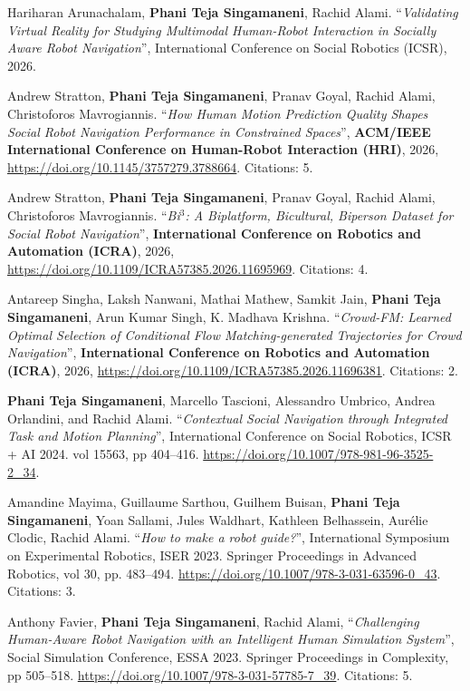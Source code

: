 \documentclass[11pt]{article}
\newcounter{descenum}
\newenvironment{descenumerate}[2]{%
  \setcounter{descenum}{#2}%
  \begin{enumerate}[
    topsep=0pt,
    itemsep=3pt,
    partopsep=0pt,
    parsep=0pt,
    label={[#1\arabic{descenum}]}
  ]
}{
  \end{enumerate}
}
\newcommand{\descitem}{%
  \item
  \addtocounter{descenum}{-1}
}
\newcommand{\bt}[1]{{\textbf{\color{teal} #1}}}
\begin{document}
\begin{descenumerate}{C}{22}
    \descitem \label{icsr26} Hariharan Arunachalam, \textbf{Phani Teja Singamaneni}, Rachid Alami. ``\textit{Validating Virtual Reality for Studying Multimodal Human-Robot Interaction in Socially Aware Robot Navigation}'', International Conference on Social Robotics (ICSR), 2026.

    \descitem \label{hri26} Andrew Stratton, \textbf{Phani Teja Singamaneni}, Pranav Goyal, Rachid Alami, Christoforos Mavrogiannis. ``\textit{How Human Motion Prediction Quality Shapes Social Robot Navigation Performance in Constrained Spaces}'', \bt{ACM/IEEE International Conference on Human-Robot Interaction (HRI)}, 2026, \url{https://doi.org/10.1145/3757279.3788664}. Citations: 5.
    
    \descitem \label{bi3dataset}  Andrew Stratton, \textbf{Phani Teja Singamaneni}, Pranav Goyal, Rachid Alami, Christoforos Mavrogiannis. ``\textit{Bi$^3$: A Biplatform, Bicultural, Biperson Dataset for Social Robot Navigation}'', \bt{International Conference on Robotics and Automation (ICRA)}, 2026, \url{https://doi.org/10.1109/ICRA57385.2026.11695969}. Citations: 4.
    \descitem \label{rrc-irca26} Antareep Singha, Laksh Nanwani, Mathai Mathew, Samkit Jain, \textbf{Phani Teja Singamaneni}, Arun Kumar Singh, K. Madhava Krishna. ``\textit{Crowd-FM: Learned Optimal Selection of Conditional Flow Matching-generated Trajectories for Crowd Navigation}'', \bt{International Conference on Robotics and Automation (ICRA)}, 2026, \url{https://doi.org/10.1109/ICRA57385.2026.11696381}. Citations: 2.

    \descitem \label{icsr24} {\textbf{Phani Teja Singamaneni}, Marcello Tascioni, Alessandro Umbrico, Andrea Orlandini, and Rachid Alami. ``\textit{Contextual Social Navigation through Integrated Task and Motion Planning}'', International Conference on Social Robotics, ICSR + AI 2024. vol 15563, pp 404–416. \url{https://doi.org/10.1007/978-981-96-3525-2_34}.}

    \descitem \label{mummer} {Amandine Mayima, Guillaume Sarthou, Guilhem Buisan, \textbf{Phani Teja Singamaneni}, Yoan Sallami, Jules Waldhart, Kathleen Belhassein, Aurélie Clodic, Rachid Alami. ``\textit{How to make a robot guide?}'', International Symposium on Experimental Robotics, ISER 2023. Springer Proceedings in Advanced Robotics, vol 30, pp. 483–494. \url{https://doi.org/10.1007/978-3-031-63596-0_43}.} Citations: 3.

    \descitem \label{inhus3} {Anthony Favier, \textbf{Phani Teja Singamaneni}, Rachid Alami, ``\textit{Challenging Human-Aware Robot Navigation with an Intelligent Human Simulation System}'', Social Simulation Conference, ESSA 2023. Springer Proceedings in Complexity, pp 505–518. \url{https://doi.org/10.1007/978-3-031-57785-7_39}.} Citations: 5.


\end{descenumerate}
\end{document}
